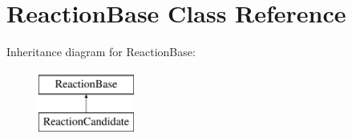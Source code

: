 \hypertarget{classReactionBase}{}\section{Reaction\+Base Class Reference}
\label{classReactionBase}
Inheritance diagram for Reaction\+Base\+:\begin{figure}[H]
\begin{center}
\leavevmode
\includegraphics[height=2.000000cm]{classReactionBase}
\end{center}
\end{figure}
